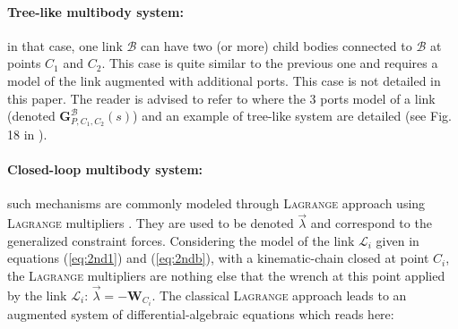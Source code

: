 \paragraph{Tree-like multibody system:}
in that case, one link $\mathcal{B}$ can have two (or more) child bodies connected to  $\mathcal{B}$ at points $C_1$ and $C_2$. This case is quite similar to the previous one and requires a model of the link  augmented with additional ports. This case is not detailed in this paper. The reader is advised to refer to \cite{Alazard2015} where the 3 ports model of a link (denoted $\mathbf{G}_{P,C_1,C_2}^{\mathcal{B}}(s)$) and an example of tree-like system are detailed (see Fig. 18 in \cite{Alazard2015}).

\paragraph{Closed-loop multibody system:} such mechanisms are commonly modeled through \textsc{Lagrange} approach using \textsc{Lagrange} multipliers \cite{ShabanaMSD1997,Simeon2006}. They are used to be denoted $\vec{\lambda}$ and correspond to the generalized constraint forces. Considering the model of the link $\mathcal{L}_i$ given in equations (\ref{eq:2nd1}) and (\ref{eq:2ndb}), with a kinematic-chain closed at point $C_i$, the \textsc{Lagrange} multipliers are nothing else that the wrench at this point applied by the link $\mathcal{L}_i$: $\vec{\lambda}=-\mathbf{W}_{C_i}$. The classical \textsc{Lagrange} approach leads to an augmented system of differential-algebraic equations which reads here:

